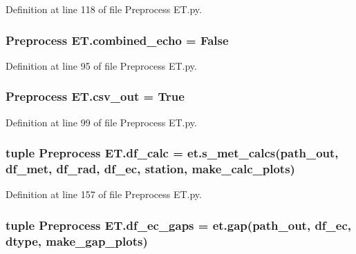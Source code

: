Definition at line 118 of file Preprocess E\+T.\+py.

\hypertarget{namespace_preprocess_01_e_t_aac725ccf80572247e41121e75a0c34a6}{}
\subsubsection[{combined\+\_\+echo}]{\setlength{\rightskip}{0pt plus 5cm}Preprocess E\+T.\+combined\+\_\+echo = False}\label{namespace_preprocess_01_e_t_aac725ccf80572247e41121e75a0c34a6}


Definition at line 95 of file Preprocess E\+T.\+py.

\hypertarget{namespace_preprocess_01_e_t_a13722152c5bbb268e7c8974b9617c267}{}
\subsubsection[{csv\+\_\+out}]{\setlength{\rightskip}{0pt plus 5cm}Preprocess E\+T.\+csv\+\_\+out = True}\label{namespace_preprocess_01_e_t_a13722152c5bbb268e7c8974b9617c267}


Definition at line 99 of file Preprocess E\+T.\+py.

\hypertarget{namespace_preprocess_01_e_t_aa5d831074aac0c39a8a6f172474c8913}{}
\subsubsection[{df\+\_\+calc}]{\setlength{\rightskip}{0pt plus 5cm}tuple Preprocess E\+T.\+df\+\_\+calc = et.\+s\+\_\+met\+\_\+calcs({\bf path\+\_\+out}, {\bf df\+\_\+met}, df\+\_\+rad, df\+\_\+ec, {\bf station}, {\bf make\+\_\+calc\+\_\+plots})}\label{namespace_preprocess_01_e_t_aa5d831074aac0c39a8a6f172474c8913}


Definition at line 157 of file Preprocess E\+T.\+py.

\hypertarget{namespace_preprocess_01_e_t_a3e29a909f23bb43820f8279794542b1a}{}
\subsubsection[{df\+\_\+ec\+\_\+gaps}]{\setlength{\rightskip}{0pt plus 5cm}tuple Preprocess E\+T.\+df\+\_\+ec\+\_\+gaps = et.\+gap({\bf path\+\_\+out}, df\+\_\+ec, {\bf dtype}, {\bf make\+\_\+gap\+\_\+plots})}\label{namespace_preprocess_01_e_t_a3e29a909f23bb43820f8279794542b1a}


